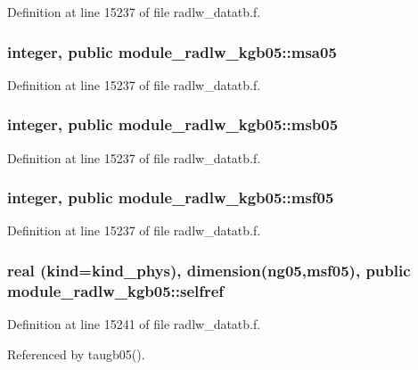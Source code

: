 Definition at line 15237 of file radlw\+\_\+datatb.\+f.

\subsubsection[{\texorpdfstring{msa05}{msa05}}]{\setlength{\rightskip}{0pt plus 5cm}integer, public module\+\_\+radlw\+\_\+kgb05\+::msa05}\hypertarget{namespacemodule__radlw__kgb05_a79c5177c6d0e56a69f4d1a0704879539}{}\label{namespacemodule__radlw__kgb05_a79c5177c6d0e56a69f4d1a0704879539}


Definition at line 15237 of file radlw\+\_\+datatb.\+f.

\subsubsection[{\texorpdfstring{msb05}{msb05}}]{\setlength{\rightskip}{0pt plus 5cm}integer, public module\+\_\+radlw\+\_\+kgb05\+::msb05}\hypertarget{namespacemodule__radlw__kgb05_a0f3b6573bfe94c5a5968cda2dc8b1adf}{}\label{namespacemodule__radlw__kgb05_a0f3b6573bfe94c5a5968cda2dc8b1adf}


Definition at line 15237 of file radlw\+\_\+datatb.\+f.

\subsubsection[{\texorpdfstring{msf05}{msf05}}]{\setlength{\rightskip}{0pt plus 5cm}integer, public module\+\_\+radlw\+\_\+kgb05\+::msf05}\hypertarget{namespacemodule__radlw__kgb05_a1c9a43b7011e7328fa62d3ecd29acc73}{}\label{namespacemodule__radlw__kgb05_a1c9a43b7011e7328fa62d3ecd29acc73}


Definition at line 15237 of file radlw\+\_\+datatb.\+f.

\subsubsection[{\texorpdfstring{selfref}{selfref}}]{\setlength{\rightskip}{0pt plus 5cm}real (kind=kind\+\_\+phys), dimension(ng05,{\bf msf05}), public module\+\_\+radlw\+\_\+kgb05\+::selfref}\hypertarget{namespacemodule__radlw__kgb05_a3c727eabe159c88fca912f33a2b91943}{}\label{namespacemodule__radlw__kgb05_a3c727eabe159c88fca912f33a2b91943}


Definition at line 15241 of file radlw\+\_\+datatb.\+f.



Referenced by taugb05().

